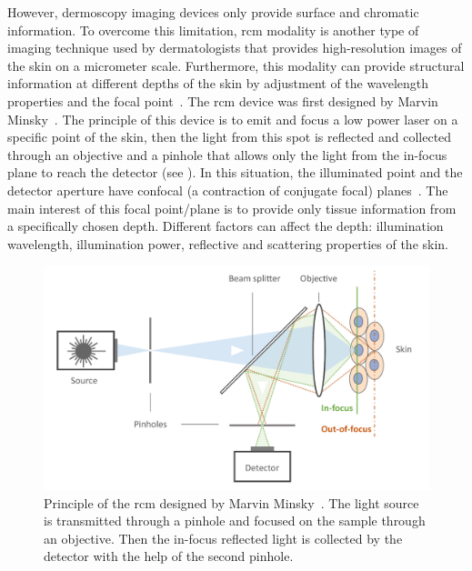 \documentclass[journal,article,accept,moreauthors,pdftex, applsci]{Definitions/mdpi}
\begin{document}
However, dermoscopy imaging devices only provide surface and chromatic information. To overcome this limitation, \ac{rcm} modality is another type of imaging technique used by dermatologists that provides high-resolution images of the skin on a micrometer scale. Furthermore, this modality can provide structural information at different depths of the skin by adjustment of the wavelength properties and the focal point~\cite{Kolm2012}. The \ac{rcm} device was first designed by Marvin Minsky~\cite{marvin1961}. The principle of this device is to emit and focus a low power laser on a specific point of the skin, then the light from this spot is reflected and collected through an objective and a pinhole that allows only the light from the in-focus plane to reach the detector (see ). In this situation, the illuminated point and the detector aperture have confocal (a contraction of conjugate focal) planes~\cite{Nehal2008a}. The main interest of this focal point/plane is to provide only tissue information from a specifically chosen depth. Different factors can affect the depth: illumination wavelength, illumination power, reflective and scattering properties of the skin.\par

\begin{figure}[H]
    \begin{center}
        \includegraphics[width=0.84\linewidth]{Figures/RCM.pdf}
        \caption{Principle of the \ac{rcm} designed by Marvin Minsky~\cite{marvin1961}. The light source is transmitted through a pinhole and focused on the sample through an objective. Then the in-focus reflected light is collected by the detector  with the help of the second pinhole.}
        \label{fig:rcm}
    \end{center} 
\end{figure}\par
\end{document}
